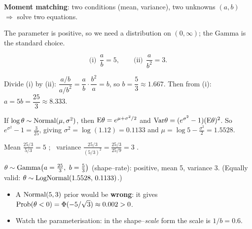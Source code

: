 \documentclass[11pt]{article}
\begin{document}
\begin{keyidea}
\textbf{Moment matching}: two conditions (mean, variance), two unknowns $(a,b)$ $\Rightarrow$ solve two equations.
\end{keyidea}

\solution
{}
The parameter is positive, so we need a distribution on $(0,\infty)$; the Gamma is the standard choice.

\[
\text{(i)}\ \ \frac ab=5,\qquad\text{(ii)}\ \ \frac{a}{b^2}=3.
\]

Divide (i) by (ii): $\dfrac{a/b}{a/b^2}=\dfrac{a}{b}\cdot\dfrac{b^2}{a}=b$, so $b=\dfrac53\approx1.667$.
Then from (i): $a=5b=\dfrac{25}{3}\approx8.333$.

If $\log\theta\sim\mathrm{Normal}(\mu,\sigma^2)$, then $\mathrm{E}\theta=e^{\mu+\sigma^2/2}$ and $\mathrm{Var}\theta=(e^{\sigma^2}-1)(\mathrm{E}\theta)^2$. So $e^{\sigma^2}-1=\frac{3}{25}$, giving $\sigma^2=\log(1.12)=0.1133$ and $\mu=\log5-\frac{\sigma^2}2=1.5528$.

\begin{sanity}
Mean $\frac{25/3}{5/3}=5$ \checkmark; \ variance $\frac{25/3}{(5/3)^2}=\frac{25/3}{25/9}=3$ \checkmark.
\end{sanity}

\begin{answer}
$\theta\sim\dist{Gamma}\big(a=\tfrac{25}{3},\ b=\tfrac53\big)$ (shape--rate): positive, mean 5, variance 3.
(Equally valid: $\theta\sim\mathrm{LogNormal}(1.5528,\,0.1133)$.)
\end{answer}

\begin{takeaway}
\begin{itemize}
\item A $\mathrm{Normal}(5,3)$ prior would be \textbf{wrong}: it gives $\mathrm{Prob}(\theta<0)=\Phi(-5/\sqrt3)\approx0.002>0$.
\item Watch the parameterisation: in the shape--\emph{scale} form the scale is $1/b=0.6$.
\end{itemize}
\end{takeaway}

\end{document}
